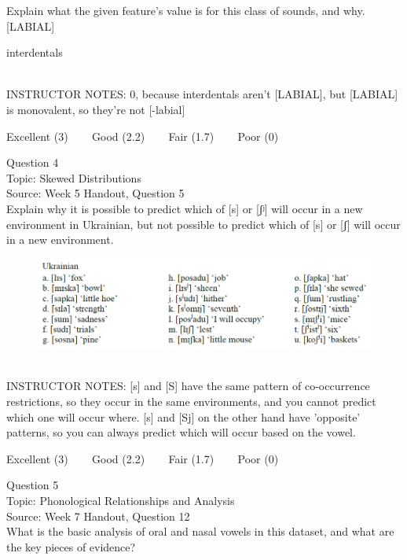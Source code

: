 \documentclass[12pt]{article}
\begin{document}
Explain what the given feature’s value is for this class of sounds, and why.\\

{[LABIAL]}

interdentals


~\\
INSTRUCTOR NOTES: 0, because interdentals aren't [LABIAL], but [LABIAL] is monovalent, so they're not [-labial]


\vfill
Excellent (3) ~~~ Good (2.2) ~~~ Fair (1.7) ~~~ Poor (0)
\newpage

{\large Question 4}\\

Topic: Skewed Distributions\\
Source: Week 5 Handout, Question 5\\

Explain why it is possible to predict which of [s] or [ʃʲ] will occur in a new environment in Ukrainian, but not possible to predict which of [s] or [ʃ] will occur in a new environment.\\

\begin{figure}[H]
\includegraphics{../images/ukrainian.png}
\end{figure}

~\\
INSTRUCTOR NOTES: [s] and [S] have the same pattern of co-occurrence restrictions, so they occur in the same environments, and you cannot predict which one will occur where. [s] and [Sj] on the other hand have 'opposite' patterns, so you can always predict which will occur based on the vowel.


\vfill
Excellent (3) ~~~ Good (2.2) ~~~ Fair (1.7) ~~~ Poor (0)
\newpage

{\large Question 5}\\

Topic: Phonological Relationships and Analysis\\
Source: Week 7 Handout, Question 12\\

What is the basic analysis of oral and nasal vowels in this dataset, and what are the key pieces of evidence?\\
\end{document}
